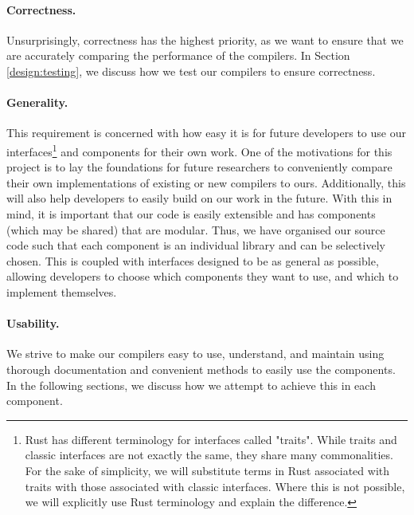 \paragraph{Correctness.} Unsurprisingly, correctness has the highest priority, 
as we want to ensure that we are accurately comparing 
the performance of the compilers. In Section \ref{design:testing}, 
we discuss how we test our compilers to ensure correctness. 

\paragraph{Generality.} This requirement is concerned with how easy it is for 
future developers to use our interfaces\footnote{Rust has different 
terminology for interfaces called "traits". While traits and classic interfaces are not 
exactly the same, they share many commonalities. For the sake of simplicity, we will 
substitute terms in Rust associated with traits with those associated with classic 
interfaces. Where this is not possible, we will explicitly use Rust terminology and 
explain the difference.}
 and components for their own work. 
One of the motivations for this project is to lay the foundations for 
future researchers to conveniently compare their own implementations 
of existing or new compilers to ours. Additionally, this will also help 
developers to easily build on our work in the future. 
With this in mind, it is important that our code is easily extensible and 
has components (which may be shared) that are modular. Thus, we have 
organised our source code such that each component is an individual
library and can be selectively chosen. This is coupled with interfaces 
designed to be as general as possible, allowing
developers to choose which components they want to use, and 
which to implement themselves. 

\paragraph{Usability.} We strive to make our compilers easy to use, understand, 
and maintain using thorough documentation and convenient 
methods to easily use the components. In the following sections, we
discuss how we attempt to achieve this in each component. 

